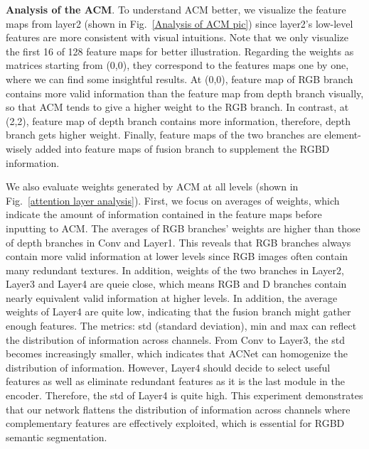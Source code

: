 \documentclass{article}
\begin{document}
\textbf{Analysis of the ACM}. To understand ACM better, we visualize the feature maps from layer2 (shown in Fig.~\ref{Analysis of ACM pic}) since layer2's low-level features are more consistent with visual intuitions. Note that we only visualize the first 16 of 128 feature maps for better illustration. Regarding the weights as matrices starting from (0,0), they correspond to the features maps one by one, where we can find some insightful results. At (0,0), feature map of RGB branch contains more valid information than the feature map from depth branch visually, so that ACM tends to give a higher weight to the RGB branch. In contrast, at (2,2), feature map of depth branch contains more information, therefore, depth branch gets higher weight. Finally, feature maps of the two branches are element-wisely added into feature maps of fusion branch to supplement the RGBD information.

We also evaluate weights generated by ACM at all levels (shown in Fig.~\ref{attention layer analysis}). First, we focus on averages of weights, which indicate the amount of information contained in the feature maps before inputting to ACM. 
The averages of RGB branches' weights are higher than those of depth branches in Conv and Layer1. This reveals that RGB branches always contain more valid information at lower levels since RGB images often contain many redundant textures. In addition, weights of the two branches in Layer2, Layer3 and Layer4 are queie close, which means RGB and D branches contain nearly equivalent valid information at higher levels. In addition, the average weights of Layer4 are quite low, indicating that the fusion branch might gather enough features. 
The metrics: std (standard deviation), min and max can reflect the distribution of information across channels. From Conv to Layer3, the std becomes increasingly smaller, which indicates that ACNet can homogenize the distribution of information. However, Layer4 should decide to select useful features as well as eliminate redundant features as it is the last module in the encoder. Therefore, the std of Layer4 is quite high. This experiment demonstrates that our network flattens the distribution of information across channels where complementary features are effectively exploited, which is essential for RGBD semantic segmentation.
\end{document}

